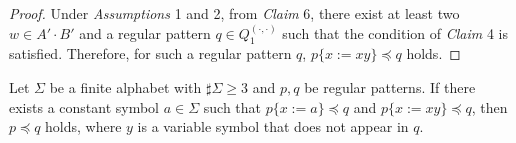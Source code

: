 \begin{proof}
\smallskip

Under \textit{Assumptions} 1 and 2, from \textit{Claim} 6, there exist at least two $w\in A'\cdot B'$ and a regular pattern $q \in Q_{1}^{(\cdot,\cdot)}$ such that the condition of \textit{Claim} 4 is satisfied. 
Therefore, for such a regular pattern $q$, $p \{x := xy\} \preceq q$ holds.
\end{proof}

\begin{lem}\label{補題15}
Let $\Sigma$ be a finite alphabet with $\sharp \Sigma \ge 3$ and $p,q$ be regular patterns.
If there exists a constant symbol $a \in \Sigma$ such that $p \{ x := a \} \preceq q$ and $p \{ x := xy \} \preceq q$, then $p \preceq q$ holds, where $y$ is a variable symbol that does not appear in $q$.
\end{lem}


%
